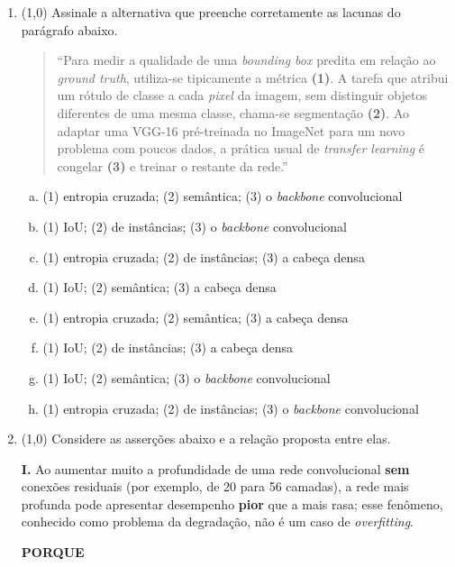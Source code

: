 \documentclass[11pt,a4paper]{article}
\begin{document}
\begin{enumerate}[1)]
\item (1{,}0) Assinale a alternativa que preenche corretamente as lacunas do parágrafo abaixo.

\begin{quote}
``Para medir a qualidade de uma \textit{bounding box} predita em relação ao \textit{ground truth}, utiliza-se tipicamente a métrica \textbf{(1)}. A tarefa que atribui um rótulo de classe a cada \textit{pixel} da imagem, sem distinguir objetos diferentes de uma mesma classe, chama-se segmentação \textbf{(2)}. Ao adaptar uma VGG-16 pré-treinada no ImageNet para um novo problema com poucos dados, a prática usual de \textit{transfer learning} é congelar \textbf{(3)} e treinar o restante da rede.''
\end{quote}

\begin{enumerate}[a)]
    \item (1) entropia cruzada; (2) semântica; (3) o \textit{backbone} convolucional
    \item (1) IoU; (2) de instâncias; (3) o \textit{backbone} convolucional
    \item (1) entropia cruzada; (2) de instâncias; (3) a cabeça densa
    \item (1) IoU; (2) semântica; (3) a cabeça densa
    \item (1) entropia cruzada; (2) semântica; (3) a cabeça densa
    \item (1) IoU; (2) de instâncias; (3) a cabeça densa
    \item (1) IoU; (2) semântica; (3) o \textit{backbone} convolucional
    \item (1) entropia cruzada; (2) de instâncias; (3) o \textit{backbone} convolucional
\end{enumerate}

\item (1{,}0) Considere as asserções abaixo e a relação proposta entre elas.

\textbf{I.} Ao aumentar muito a profundidade de uma rede convolucional \textbf{sem} conexões residuais (por exemplo, de 20 para 56 camadas), a rede mais profunda pode apresentar desempenho \textbf{pior} que a mais rasa; esse fenômeno, conhecido como problema da degradação, não é um caso de \textit{overfitting}.

\begin{center}\textbf{PORQUE}\end{center}


\end{enumerate}
\end{document}
